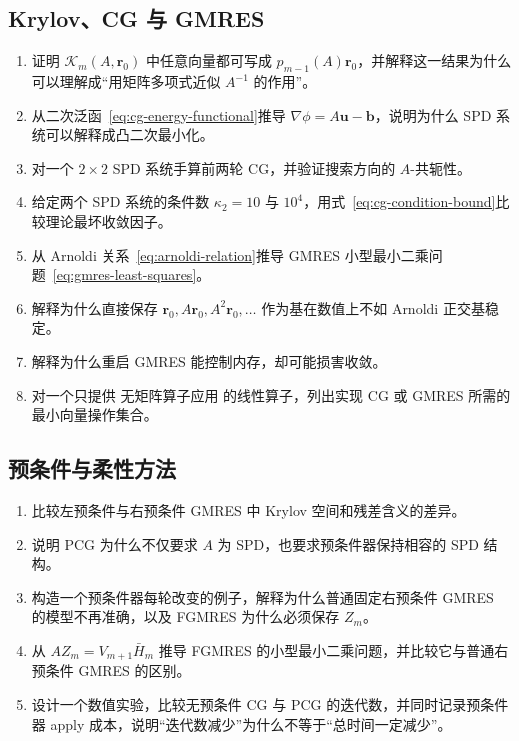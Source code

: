 \subsection*{Krylov、CG 与 GMRES}
\begin{enumerate}[label=\arabic*.]
\item 证明 $\mathcal K_m(A,\bm r_0)$ 中任意向量都可写成 $p_{m-1}(A)\bm r_0$，并解释这一结果为什么可以理解成“用矩阵多项式近似 $A^{-1}$ 的作用”。
\item 从二次泛函~\eqref{eq:cg-energy-functional}推导 $\nabla\phi=A\bm u-\bm b$，说明为什么 SPD 系统可以解释成凸二次最小化。
\item 对一个 $2\times2$ SPD 系统手算前两轮 CG，并验证搜索方向的 $A$-共轭性。
\item 给定两个 SPD 系统的条件数 $\kappa_2=10$ 与 $10^4$，用式~\eqref{eq:cg-condition-bound}比较理论最坏收敛因子。
\item 从 Arnoldi 关系~\eqref{eq:arnoldi-relation}推导 GMRES 小型最小二乘问题~\eqref{eq:gmres-least-squares}。
\item 解释为什么直接保存 $\bm r_0,A\bm r_0,A^2\bm r_0,\ldots$ 作为基在数值上不如 Arnoldi 正交基稳定。
\item 解释为什么重启 GMRES 能控制内存，却可能损害收敛。
\item 对一个只提供 无矩阵算子应用 的线性算子，列出实现 CG 或 GMRES 所需的最小向量操作集合。
\end{enumerate}

\subsection*{预条件与柔性方法}
\begin{enumerate}[label=\arabic*.]
\item 比较左预条件与右预条件 GMRES 中 Krylov 空间和残差含义的差异。
\item 说明 PCG 为什么不仅要求 $A$ 为 SPD，也要求预条件器保持相容的 SPD 结构。
\item 构造一个预条件器每轮改变的例子，解释为什么普通固定右预条件 GMRES 的模型不再准确，以及 FGMRES 为什么必须保存 $Z_m$。
\item 从 $AZ_m=V_{m+1}\bar H_m$ 推导 FGMRES 的小型最小二乘问题，并比较它与普通右预条件 GMRES 的区别。
\item 设计一个数值实验，比较无预条件 CG 与 PCG 的迭代数，并同时记录预条件器 apply 成本，说明“迭代数减少”为什么不等于“总时间一定减少”。
\end{enumerate}